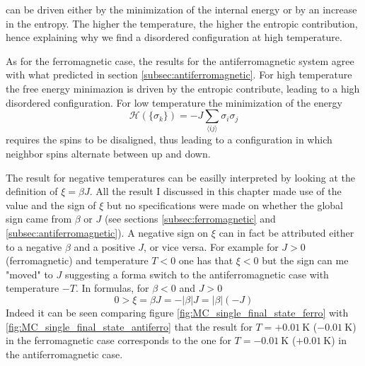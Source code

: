 can be driven either by the minimization of the internal energy or by an increase in the entropy. The higher the temperature, the higher the entropic contribution, hence explaining why 
we find a disordered configuration at high temperature. \par
\vspace{10pt}
As for the ferromagnetic case, the results for the antiferromagnetic system agree with what predicted in section \ref{subsec:antiferromagnetic}. For high temperature the free energy minimazion is driven by the entropic contribute, leading to a high disordered configuration. 
For low temperature the minimization of the energy 
\begin{equation*}
    \mathcal{H}(\{\sigma_k\}) = -J \sum_{\langle i j\rangle}\sigma_{i} \sigma_{j}
\end{equation*}
requires the spins to be disaligned, thus leading to a configuration in which neighbor spins alternate between up and down. \par
\vspace{10pt}
The result for negative temperatures can be easilly interpreted by looking at the definition of $\xi = \beta J$. All the result I discussed in this chapter made use of the value and the sign of $\xi$ but no specifications were made on whether the global sign came from $\beta$ or $J$ (see sections \ref{subsec:ferromagnetic} and \ref{subsec:antiferromagnetic}). A negative sign on $\xi$ can in fact be attributed either to 
a negative $\beta$ and a positive $J$, or vice versa. For example for $J>0$ (ferromagnetic) and temperature $T<0$ one has that $\xi < 0$ but the sign can me "moved" to $J$ suggesting a forma switch to the antiferromagnetic case with temperature $-T$. In formulas, for $\beta < 0$ and $J > 0$
\begin{equation*}
    0 > \xi = \beta J = -|\beta| J = |\beta| (-J)
\end{equation*}
Indeed it can be seen comparing figure \ref{fig:MC_single_final_state_ferro} with \ref{fig:MC_single_final_state_antiferro} that the result for $T = +\SI{0.01}{\kelvin}$ ($-\SI{0.01}{\kelvin}$) in the ferromagnetic case corresponds to the one for $T = - \SI{0.01}{\kelvin}$ ($+\SI{0.01}{\kelvin}$) in the antiferromagnetic case.

